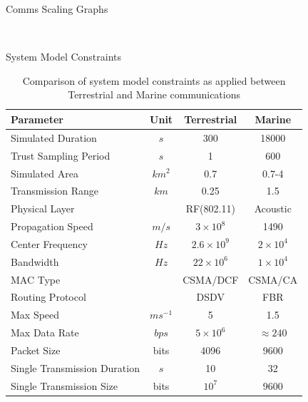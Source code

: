 \documentclass{beamer}
\begin{document}
\begin{frame}[allowframebreaks]{Comms Scaling Graphs}

  \begin{figure}[h]
    \centering
    \\
    \label{fig:CommsThroughputRatios}
  \end{figure}

\end{frame}

\begin{frame}[shrink]{System Model Constraints}
\centering
\begin{table}[h]
  \caption{Comparison of system model constraints as applied between Terrestrial and Marine communications} \label{tab:sysconstraints}
  \begin{center}
    \setlength{\tabcolsep}{8pt}
    \begin{tabular}{lccc}
      \toprule
      Parameter & Unit & Terrestrial & Marine \\
      \midrule
      Simulated Duration & $s$ & 300 & 18000\\
      Trust Sampling Period & $s$ & 1 & 600 \\
      Simulated Area & $km^2$ & 0.7 & 0.7-4 \\
      Transmission Range & $km$ & 0.25 & 1.5 \\
      Physical Layer & & RF(802.11) & Acoustic\\
      Propagation Speed& $m/s$ & $3\times10^8$ & 1490\\
      Center Frequency& $Hz$ & $2.6\times10^9$ & $2 \times 10^4$ \\
      Bandwidth& $Hz$ & $22\times10^6$ & $1\times10^4$\\
      MAC Type & & CSMA/DCF & CSMA/CA\\
      Routing Protocol & & DSDV & FBR \\
      Max Speed & $ms^{-1}$ & 5 & 1.5 \\
      Max Data Rate & $bps$ & $5\times10^6$ & $\approx 240$ \\
      Packet Size & bits & 4096 &  9600 \\
      Single Transmission Duration & $s$ & 10 & 32 \\
      Single Transmission Size & bits & $10^7$ & $9600$ \\
      \bottomrule
    \end{tabular}
    \setlength{\tabcolsep}{6pt}
  \end{center}
\end{table}

\end{frame}
\end{document}
